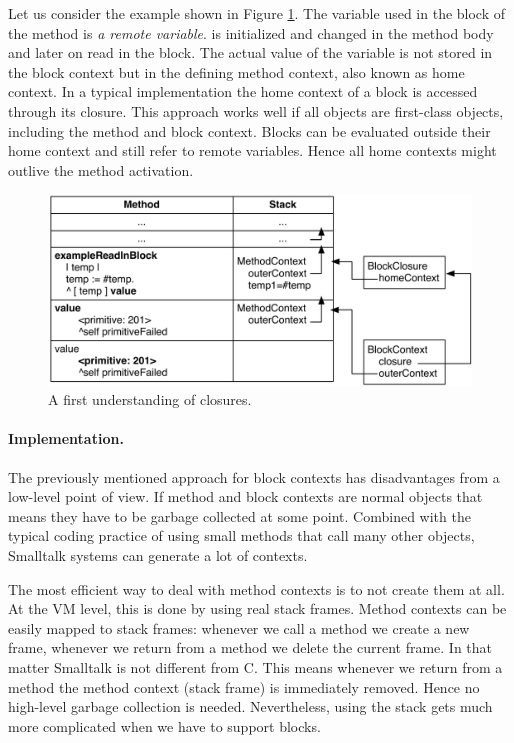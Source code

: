 \documentclass[a4paper,10pt,twoside]{book}
\begin{document}
Let us consider the example shown in Figure \ref{fig:BlockWithFullClosures}.
The  variable used in the block of the  method is \emph{a remote variable}.
 is initialized and changed in the method body and later on read in the block.
The actual value of the variable is not stored in the block context but in the defining method context, also known as home context.
In a typical implementation the home context of a block is accessed through its closure.
This approach works well if all objects are first-class objects, including the method and block context.
Blocks can be evaluated outside their home context and still refer to remote variables.
Hence all home contexts might outlive the method activation.

\begin{figure}
  \begin{center}
    \includegraphics[width=\textwidth]{BlockWithFullClosures}
    \caption{A first understanding of closures.\label{fig:BlockWithFullClosures}}
  \end{center}
\end{figure}

\paragraph{Implementation.} The previously mentioned approach for block contexts has disadvantages from a low-level point of view.
If method and block contexts are normal objects that means they have to be garbage collected at some point.
Combined with the typical coding practice of using small methods that call many other objects, Smalltalk systems can generate a lot of contexts.

The most efficient way to deal with method contexts is to not create them at all.
At the VM level, this is done by using real stack frames.
Method contexts can be easily mapped to stack frames: whenever we call a method we create a new frame, whenever we return from a method we delete the current frame.
In that matter Smalltalk is not different from C.
This means whenever we return from a method the method context (stack frame) is immediately removed.
Hence no high-level garbage collection is needed.
Nevertheless, using the stack gets much more complicated when we have to support blocks.
\end{document}

